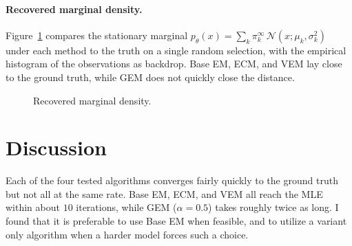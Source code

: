 \documentclass{article}
\begin{document}
\paragraph{Recovered marginal density.}
Figure~\ref{fig:em-density} compares the stationary marginal
$p_\theta(x) = \sum_k \pi^\infty_k \, \mathcal{N}(x; \mu_k, \sigma_k^2)$
under each method to the truth on a single random selection, with the
empirical histogram of the observations as backdrop. Base
EM, ECM, and VEM lay close to the ground truth, while GEM does not quickly close the distance.

\begin{figure}[t]
  \centering
  \caption{Recovered marginal density.}
  \label{fig:em-density}
\end{figure}


\pagebreak
\section{Discussion}


Each of the four tested algorithms converges fairly quickly to the ground truth but not all at the same rate.
Base EM, ECM, and VEM all reach the MLE within about $10$ iterations, while GEM ($\alpha = 0.5$) takes roughly twice as long.
I found that it is preferable to use Base EM when
feasible, and to utilize a variant only algorithm when a
harder model forces such a choice.




\end{document}
